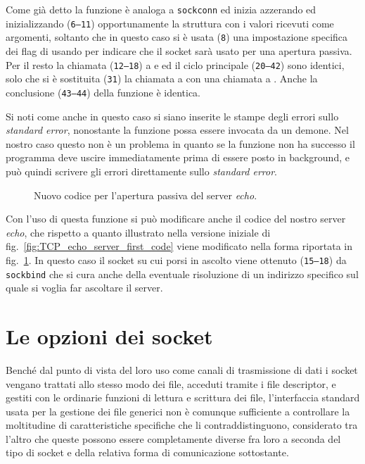 Come già detto la funzione è analoga a \texttt{sockconn} ed inizia azzerando
ed inizializzando (\texttt{\small 6--11}) opportunamente la struttura
 con i valori ricevuti come argomenti, soltanto che in questo caso
si è usata (\texttt{\small 8}) una impostazione specifica dei flag di
 usando  per indicare che il socket sarà usato
per una apertura passiva. Per il resto la chiamata (\texttt{\small 12--18}) a
 e ed il ciclo principale (\texttt{\small 20--42}) sono
identici, solo che si è sostituita (\texttt{\small 31}) la chiamata a
 con una chiamata a . Anche la conclusione
(\texttt{\small 43--44}) della funzione è identica.

Si noti come anche in questo caso si siano inserite le stampe degli errori
sullo \textit{standard error}, nonostante la funzione possa essere invocata da
un demone. Nel nostro caso questo non è un problema in quanto se la funzione
non ha successo il programma deve uscire immediatamente prima di essere posto
in background, e può quindi scrivere gli errori direttamente sullo
\textit{standard error}.

\begin{figure}[!htbp]
  \footnotesize \centering
  \begin{minipage}[c]{\codesamplewidth}
  \end{minipage}
  \normalsize
  \caption{Nuovo codice per l'apertura passiva del server \textit{echo}.}
  \label{fig:TCP_echod_third}
\end{figure}

Con l'uso di questa funzione si può modificare anche il codice del nostro
server \textit{echo}, che rispetto a quanto illustrato nella versione iniziale
di fig.~\ref{fig:TCP_echo_server_first_code} viene modificato nella forma
riportata in fig.~\ref{fig:TCP_echod_third}. In questo caso il socket su cui
porsi in ascolto viene ottenuto (\texttt{\small 15--18}) da \texttt{sockbind}
che si cura anche della eventuale risoluzione di un indirizzo specifico sul
quale si voglia far ascoltare il server.


\section{Le opzioni dei socket}
\label{sec:sock_options}

Benché dal punto di vista del loro uso come canali di trasmissione di dati i
socket vengano trattati allo stesso modo dei file, acceduti tramite i file
descriptor, e gestiti con le ordinarie funzioni di lettura e scrittura dei
file, l'interfaccia standard usata per la gestione dei file generici non è
comunque sufficiente a controllare la moltitudine di caratteristiche
specifiche che li contraddistinguono, considerato tra l'altro che queste
possono essere completamente diverse fra loro a seconda del tipo di socket e
della relativa forma di comunicazione sottostante.

